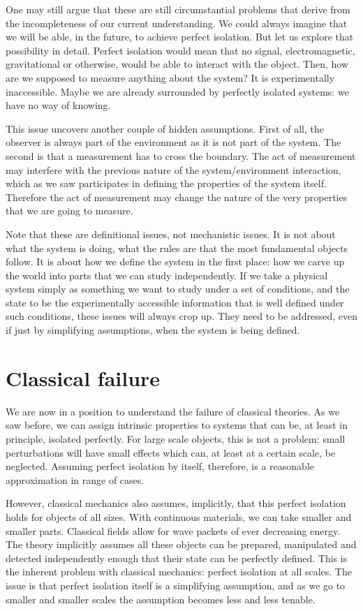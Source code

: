 \documentclass[10pt,twocolumn, nofootinbib]{revtex4-2}
\begin{document}
One may still argue that these are still circumstantial problems that derive from the incompleteness of our current understanding. We could always imagine that we will be able, in the future, to achieve perfect isolation. But let us explore that possibility in detail. Perfect isolation would mean that no signal, electromagnetic, gravitational or otherwise, would be able to interact with the object. Then, how are we supposed to measure anything about the system? It is experimentally inaccessible. Maybe we are already surrounded by perfectly isolated systems: we have no way of knowing.

This issue uncovers another couple of hidden assumptions. First of all, the observer is always part of the environment as it is not part of the system. The second is that a measurement has to cross the boundary. The act of measurement may interfere with the previous nature of the system/environment interaction, which as we saw participates in defining the properties of the system itself. Therefore the act of measurement may change the nature of the very properties that we are going to measure.

Note that these are definitional issues, not mechanistic issues. It is not about what the system is doing, what the rules are that the most fundamental objects follow. It is about how we define the system in the first place: how we carve up the world into parts that we can study independently. If we take a physical system simply as something we want to study under a set of conditions, and the state to be the experimentally accessible information that is well defined under such conditions, these issues will always crop up. They need to be addressed, even if just by simplifying assumptions, when the system is being defined.

\section{Classical failure}

We are now in a position to understand the failure of classical theories. As we saw before, we can assign intrinsic properties to systems that can be, at least in principle, isolated perfectly. For large scale objects, this is not a problem: small perturbations will have small effects which can, at least at a certain scale, be neglected. Assuming perfect isolation by itself, therefore, is a reasonable approximation in range of cases.

However, classical mechanics also assumes, implicitly, that this perfect isolation holds for objects of all sizes. With continuous materials, we can take smaller and smaller parts. Classical fields allow for wave packets of ever decreasing energy. The theory implicitly assumes all these objects can be prepared, manipulated and detected independently enough that their state can be perfectly defined. This is the inherent problem with classical mechanics: perfect isolation at all scales. The issue is that perfect isolation itself is a simplifying assumption, and as we go to smaller and smaller scales the assumption becomes less and less tenable.
\end{document}
